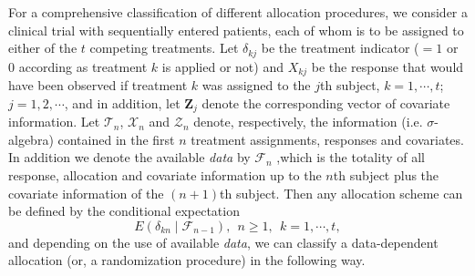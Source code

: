 For a comprehensive classification of different allocation procedures, we consider a clinical trial with sequentially entered patients, each of whom is to be assigned to either of the $t$ competing treatments. Let $\delta_{kj}$ be the treatment indicator ($= 1$ or 0 according as treatment $k$ is applied or not) and $X_{kj}$ be the response that would have been observed
if  treatment $k$ was assigned to the $j$th subject, $k=1,\cdots ,t$; $j=1,2,\cdots$, and  in addition, let  $\textbf{Z}_{j}$ denote the corresponding vector of covariate information. Let $\mathcal{T}_{n}$, $\mathcal{X}_{n}$ and $\mathcal{Z}_{n}$ denote, respectively, the information (i.e. $\sigma$-algebra) contained in the first $n$ treatment assignments, responses and covariates. In addition we denote the available \textit{data} by $\mathcal{F}_{n}$ ,which is the totality of all response, allocation and covariate information up to the $n$th subject plus the covariate information of the $(n+1)$th subject. Then any allocation scheme can be defined by the conditional expectation
$$E(\delta_{kn}\mid \mathcal{F}_{n-1}),~~ n\geq 1, ~~k=1,\cdots ,t,$$
and depending on the use of available \textit{data}, we can classify a data-dependent allocation (or, a randomization procedure) in the following way.

